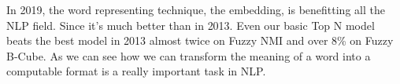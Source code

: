 In 2019, the word representing technique, the embedding, is benefitting all the NLP field. Since it's much better than in 2013. Even our basic Top N model beats the best model in 2013 almost twice on Fuzzy NMI and over 8\% on Fuzzy B-Cube. As we can see how we can transform the meaning of a word into a computable format is a really important task in NLP.